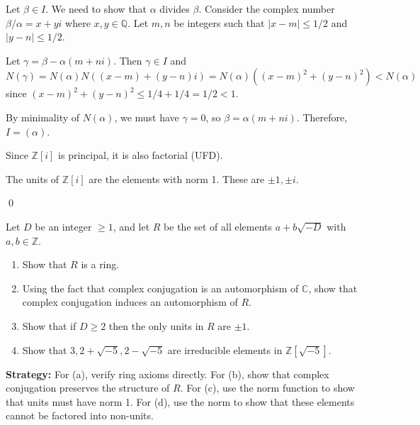 Let $\beta \in I$. We need to show that $\alpha$ divides $\beta$. Consider the complex number $\beta/\alpha = x + yi$ where $x, y \in \mathbb{Q}$. Let $m, n$ be integers such that $|x - m| \leq 1/2$ and $|y - n| \leq 1/2$.

Let $\gamma = \beta - \alpha(m + ni)$. Then $\gamma \in I$ and $N(\gamma) = N(\alpha)N((x-m) + (y-n)i) = N(\alpha)((x-m)^2 + (y-n)^2) < N(\alpha)$ since $(x-m)^2 + (y-n)^2 \leq 1/4 + 1/4 = 1/2 < 1$.

By minimality of $N(\alpha)$, we must have $\gamma = 0$, so $\beta = \alpha(m + ni)$. Therefore, $I = (\alpha)$.

Since $\mathbb{Z}[i]$ is principal, it is also factorial (UFD).

The units of $\mathbb{Z}[i]$ are the elements with norm 1. These are $\pm 1, \pm i$.


\qed
\begin{problembox}
Let $D$ be an integer $\geq 1$, and let $R$ be the set of all elements $a + b\sqrt{-D}$ with $a, b \in \mathbb{Z}$.
\begin{enumerate}[label=(\alph*)]
    \item Show that $R$ is a ring.
    \item Using the fact that complex conjugation is an automorphism of $\mathbb{C}$, show that complex conjugation induces an automorphism of $R$.
    \item Show that if $D \geq 2$ then the only units in $R$ are $\pm 1$.
    \item Show that $3, 2 + \sqrt{-5}, 2 - \sqrt{-5}$ are irreducible elements in $\mathbb{Z}[\sqrt{-5}]$.
\end{enumerate}
\end{problembox}

\noindent\textbf{Strategy:} For (a), verify ring axioms directly. For (b), show that complex conjugation preserves the structure of $R$. For (c), use the norm function to show that units must have norm 1. For (d), use the norm to show that these elements cannot be factored into non-units.

